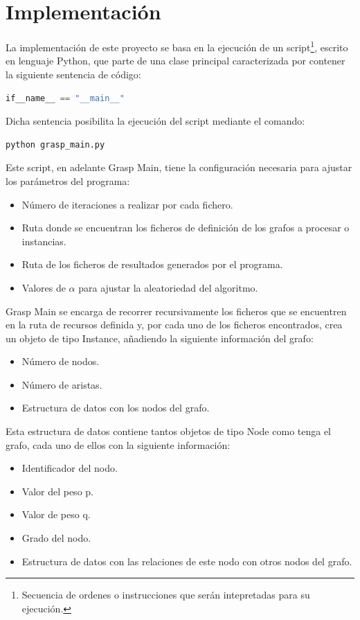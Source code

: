 \section{Implementación}
\label{sec:implementacion}
La implementación de este proyecto se basa en la ejecución de un script\footnote{Secuencia de ordenes o instrucciones que serán intepretadas para su ejecución.}, escrito en lenguaje Python, que parte de una clase principal caracterizada por contener la siguiente sentencia de código:
 \begin{lstlisting}[language=Python]
 if__name__ == "__main__"
 \end{lstlisting}
 Dicha sentencia posibilita la ejecución del script mediante el comando:
  \begin{lstlisting}[language=bash]
  python grasp_main.py
 \end{lstlisting} 

 Este script, en adelante Grasp Main, tiene la configuración necesaria para ajustar los parámetros del programa:
 \begin{itemize}
 	\item Número de iteraciones a realizar por cada fichero.
 	\item Ruta donde se encuentran los ficheros de definición de los grafos a procesar o instancias.
 	\item Ruta de los ficheros de resultados generados por el programa.	
 	\item Valores de $\alpha$ para ajustar la aleatoriedad del algoritmo.
 \end{itemize}

Grasp Main se encarga de recorrer recursivamente los ficheros que se encuentren en la ruta de recursos definida y, por cada uno de los ficheros encontrados, crea un objeto de tipo Instance, añadiendo la siguiente información del grafo:
 \begin{itemize}
	\item Número de nodos.
	\item Número de aristas.
	\item Estructura de datos con los nodos del grafo.
\end{itemize}

Esta estructura de datos contiene tantos objetos de tipo Node como tenga el grafo, cada uno de ellos con la siguiente información:
 \begin{itemize}
	\item Identificador del nodo.
	\item Valor del peso p.
	\item Valor de peso q.
	\item Grado del nodo.
	\item Estructura de datos con las relaciones de este nodo con otros nodos del grafo.
\end{itemize}


